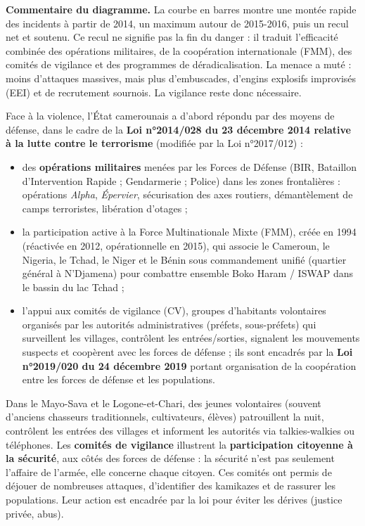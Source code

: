 \documentclass[11pt]{article}
\newcommand{\cle}[1]{{\popxbold\color{popdark}#1}}
\newcounter{popsec}
\newcounter{popsub}
\newcommand{\courssub}[1]{%
  \stepcounter{popsub}%
  \par\vspace{9pt}\noindent{\popxbold\fontsize{11.5}{13}\selectfont\color{popink}{\color{poporange}\thepopsec.\thepopsub}\hspace{6pt}#1}\par\nopagebreak\vspace{4pt}
}
\begin{document}
\textbf{Commentaire du diagramme.} La courbe en barres montre une montée rapide des incidents à partir de 2014, un maximum autour de 2015-2016, puis un recul net et soutenu. Ce recul ne signifie pas la fin du danger : il traduit l'efficacité combinée des opérations militaires, de la coopération internationale (FMM), des comités de vigilance et des programmes de déradicalisation. La menace a muté : moins d'attaques massives, mais plus d'embuscades, d'engins explosifs improvisés (EEI) et de recrutement sournois. La vigilance reste donc nécessaire.

\courssub{La réponse sécuritaire de l'État}

Face à la violence, l'État camerounais a d'abord répondu par des moyens de défense, dans le cadre de la \textbf{Loi n°2014/028 du 23 décembre 2014 relative à la lutte contre le terrorisme} (modifiée par la Loi n°2017/012) :

\begin{itemize}
\item des \textbf{opérations militaires} menées par les Forces de Défense (BIR, Bataillon d'Intervention Rapide ; Gendarmerie ; Police) dans les zones frontalières : opérations \emph{Alpha}, \emph{Épervier}, sécurisation des axes routiers, démantèlement de camps terroristes, libération d'otages ;
\item la participation active à la \cle{Force Multinationale Mixte (FMM)}, créée en 1994 (réactivée en 2012, opérationnelle en 2015), qui associe le Cameroun, le Nigeria, le Tchad, le Niger et le Bénin sous commandement unifié (quartier général à N'Djamena) pour combattre ensemble Boko Haram / ISWAP dans le bassin du lac Tchad ;
\item l'appui aux \cle{comités de vigilance} (CV), groupes d'habitants volontaires organisés par les autorités administratives (préfets, sous-préfets) qui surveillent les villages, contrôlent les entrées/sorties, signalent les mouvements suspects et coopèrent avec les forces de défense ; ils sont encadrés par la \textbf{Loi n°2019/020 du 24 décembre 2019} portant organisation de la coopération entre les forces de défense et les populations.
\end{itemize}

\begin{exemplebox}
Dans le Mayo-Sava et le Logone-et-Chari, des jeunes volontaires (souvent d'anciens chasseurs traditionnels, cultivateurs, élèves) patrouillent la nuit, contrôlent les entrées des villages et informent les autorités via talkies-walkies ou téléphones. Les \textbf{comités de vigilance} illustrent la \textbf{participation citoyenne à la sécurité}, aux côtés des forces de défense : la sécurité n'est pas seulement l'affaire de l'armée, elle concerne chaque citoyen. Ces comités ont permis de déjouer de nombreuses attaques, d'identifier des kamikazes et de rassurer les populations. Leur action est encadrée par la loi pour éviter les dérives (justice privée, abus).
\end{exemplebox}
\end{document}
